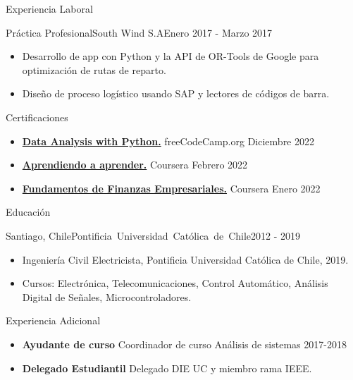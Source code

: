 \documentclass[]{mcdowellcv}
\begin{document}
\begin{cvsection}{Experiencia Laboral}
		\begin{cvsubsection}{Práctica Profesional}{South Wind S.A}{Enero 2017 - Marzo 2017}		
			\begin{itemize}
				\item Desarrollo de app con Python y la API de OR-Tools de Google para optimización de rutas de reparto.
				\item Diseño de proceso logístico usando SAP y lectores de códigos de barra.
			\end{itemize}
		\end{cvsubsection}
		
	\end{cvsection}

	\begin{cvsection}{Certificaciones}
		\begin{cvsubsection}{}{ }{}
			\begin{itemize}
				\item \textbf{\href{https://www.freecodecamp.org/certification/fcc97b8767b-5a07-4487-b743-fd7d5742d505/data-analysis-with-python-v7}{Data Analysis with Python.}} freeCodeCamp.org Diciembre 2022
				\item \textbf{\href{https://www.coursera.org/learn/aprendiendo-a-aprender}{Aprendiendo a aprender.}} Coursera Febrero 2022
				\item \textbf{\href{https://www.coursera.org/learn/finanzas-empresariales}{Fundamentos de Finanzas Empresariales.}} Coursera Enero 2022
			\end{itemize}
		\end{cvsubsection}
	\end{cvsection}
	
	\begin{cvsection}{Educación}
		\begin{cvsubsection}{Santiago, Chile}{\mbox{Pontificia Universidad Católica de Chile}}{2012 - 2019}
			\begin{itemize}
				\item Ingeniería Civil Electricista, Pontificia Universidad Católica de Chile, 2019.
				\item Cursos: Electrónica, Telecomunicaciones, Control Automático, Análisis Digital de Señales, Microcontroladores.
				\end{itemize}
		\end{cvsubsection}
	\end{cvsection}
	
	\begin{cvsection}{Experiencia Adicional}
		\begin{cvsubsection}{}{}{}	
			\begin{itemize}
				\item \textbf{Ayudante de curso} Coordinador de curso Análisis de sistemas 2017-2018
				\item \textbf{Delegado Estudiantil} Delegado DIE UC y miembro rama IEEE.
			\end{itemize}
		\end{cvsubsection}
	\end{cvsection}
	
\end{document}
